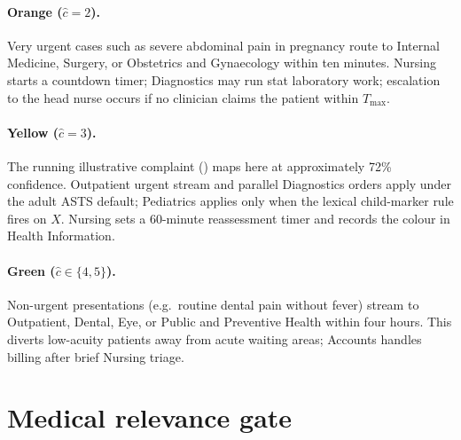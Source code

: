 \paragraph{Orange (\(\hat{c}=2\)).}
Very urgent cases such as severe abdominal pain in pregnancy route to Internal Medicine, Surgery, or Obstetrics and Gynaecology within ten minutes. Nursing starts a countdown timer; Diagnostics may run stat laboratory work; escalation to the head nurse occurs if no clinician claims the patient within \(T_{\max}\).

\paragraph{Yellow (\(\hat{c}=3\)).}
The running illustrative complaint (\runningcomplaint{}) maps here at approximately 72\% confidence. Outpatient urgent stream and parallel Diagnostics orders apply under the adult ASTS default; Pediatrics applies only when the lexical child-marker rule fires on \(X\). Nursing sets a 60-minute reassessment timer and records the colour in Health Information.

\paragraph{Green (\(\hat{c}\in\{4,5\}\)).}
Non-urgent presentations (e.g.\ routine dental pain without fever) stream to Outpatient, Dental, Eye, or Public and Preventive Health within four hours. This diverts low-acuity patients away from acute waiting areas; Accounts handles billing after brief Nursing triage.

\section{Medical relevance gate}
\label{sec:gate}

